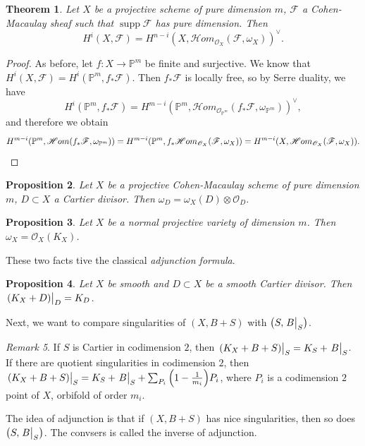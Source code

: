 \documentclass[leqno, openany]{memoir}
\newtheorem{thm}{Theorem}[section]
\newtheorem{prop}[thm]{Proposition}
\theoremstyle{definition}
\theoremstyle{remark}
\newtheorem{rmk}[thm]{Remark}
\theoremstyle{plain}
\theoremstyle{definition}
\theoremstyle{remark}
\renewcommand{\P}{\mathbb{P}}
\newcommand{\msc}[1]{\mathscr{#1}}
\DeclareMathOperator{\supp}{supp}
\begin{document}
\begin{thm}
    Let $X$ be a projective scheme of pure dimension $m$, $\msc{F}$ a Cohen-Macaulay sheaf such that $\supp \msc{F}$ has pure dimension. Then
    \[ H^i(X, \msc{F}) = {H^{n-i}(X, \msc{H}om_{\msc{O}_X}(\msc{F}, \omega_X))}^{\vee}. \]
\end{thm}

\begin{proof}
    As before, let $f \colon X \to \P^m$ be finite and surjective. We know that $H^i(X, \msc{F}) = H^i(\P^m, f_* \msc{F})$. Then $f_* \msc{F}$ is locally free, so by Serre duality, we have
    \[ H^i(\P^m, f_* \msc{F}) = { H^{m-i}(\P^m, \msc{H}om_{\msc{O}_{\P^m}}(f_* \msc{F}, \omega_{\P^m})) }^{\vee}, \]
    and therefore we obtain
    \[ H^{m-i}(\P^m, \msc{H}om(f_* \msc{F}, \omega_{\P^m})) = H^{m-i}(\P^m, f_* \msc{H}om_{\msc{O}_X}(\msc{F}, \omega_X)) = H^{m-i}(X, \msc{H}om_{\msc{O}_X}(\msc{F}, \omega_X)). \qedhere \] 
\end{proof}

\begin{prop}
    Let $X$ be a projective Cohen-Macaulay scheme of pure dimension $m$, $D \subset X$ a Cartier divisor. Then $\omega_D = \omega_X(D) \otimes \msc{O}_D$. 
\end{prop}

\begin{prop}
    Let $X$ be a normal projective variety of dimension $m$. Then $\omega_X = \msc{O}_X(K_X)$.
\end{prop}

These two facts tive the classical \textit{adjunction formula}.
\begin{prop}
    Let $X$ be smooth and $D \subset X$ be a smooth Cartier divisor. Then $\eval{(K_X + D)}_D = K_D$.
\end{prop}

Next, we want to compare singularities of $(X, B+S)$ with $\qty(S, \eval{B}_S)$. 

\begin{rmk}
    If $S$ is Cartier in codimension $2$, then $\eval{(K_X + B + S)}_S = K_S + \eval{B}_S$. If there are quotient singularities in codimension $2$, then $\eval{(K_X + B + S)}_S = K_S + \eval{B}_S + \sum_{P_i} \qty(1 - \frac{1}{m_i}) P_i$, where $P_i$ is a codimension $2$ point of $X$, orbifold of order $m_i$.
\end{rmk}

The idea of adjunction is that if $(X, B+S)$ has nice singularities, then so does $\qty(S, \eval{B}_S)$. The convsers is called the inverse of adjunction.
\end{document}
